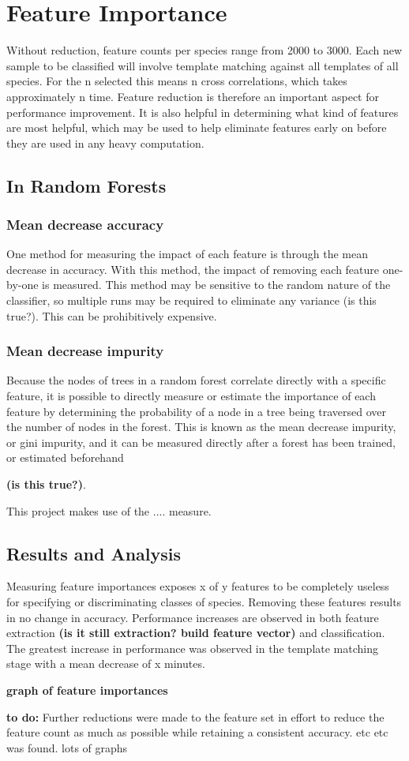 \section{Feature Importance}
Without reduction, feature counts per species range from 2000 to 3000.
Each new sample to be classified will involve template matching against all
templates of all species.
For the n selected this means n cross correlations, which takes approximately
n time.
Feature reduction is therefore an important aspect for performance improvement.
It is also helpful in determining what kind of features are most helpful, which
may be used to help eliminate features early on before they are used in any
heavy computation.

\subsection{In Random Forests}

\subsubsection{Mean decrease accuracy}
One method for measuring the impact of each feature is through the mean decrease
in accuracy.
With this method, the impact of removing each feature one-by-one is measured.
This method may be sensitive to the random nature of the classifier, so multiple
runs may be required to eliminate any variance (is this true?).
This can be prohibitively expensive.

\subsubsection{Mean decrease impurity}
Because the nodes of trees in a random forest correlate directly with a specific
feature, it is possible to directly measure or estimate the importance of each
feature by determining the probability of a node in a tree being traversed over 
the number of nodes in the forest.
This is known as the mean decrease impurity, or gini impurity, and it can be
measured directly after a forest has been trained, or estimated beforehand 

\textbf{(is this true?)}.

This project makes use of the .... measure.

\subsection{Results and Analysis}
Measuring feature importances exposes x of y features to be completely useless
for specifying or discriminating classes of species.
Removing these features results in no change in accuracy.
Performance increases are observed in both feature extraction
\textbf{(is it still extraction? build feature vector)} and classification.
The greatest increase in performance was observed in the template matching stage
with a mean decrease of x minutes.

\textbf{graph of feature importances}

\textbf{to do:}
Further reductions were made to the feature set in effort to reduce the feature
count as much as possible while retaining a consistent accuracy.
etc etc was found.
lots of graphs

